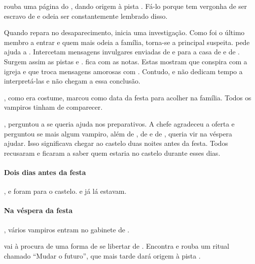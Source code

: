  rouba uma página do , dando origem à pista . Fá-lo porque tem vergonha de ser escravo de  e odeia ser constantemente lembrado disso.

Quando  repara no desaparecimento, inicia uma investigação. Como  foi o último membro a entrar e quem mais odeia a família, torna-se a principal suspeita.  pede ajuda a . Intercetam mensagens invulgares enviadas de e para a casa de  e de . Surgem assim as pistas  e .  fica com as notas. Estas mostram que  conspira com a igreja e que  troca mensagens amorosas com . Contudo,  e  não dedicam tempo a interpretá-las e não chegam a essa conclusão.

, como era costume,  marcou  como data da festa para acolher  na família. Todos os vampiros tinham de comparecer.

,  perguntou a  se queria ajuda nos preparativos. A chefe agradeceu a oferta e perguntou se mais algum vampiro, além de , de  e de , queria vir na véspera ajudar. Isso significava chegar ao castelo duas noites antes da festa. Todos recusaram e ficaram a saber quem estaria no castelo durante esses dias.

\paragraph{Dois dias antes da festa}

,  e  foram para o castelo.  e  já lá estavam.

\paragraph{Na véspera da festa}

, vários vampiros entram no gabinete de .

 vai à procura de uma forma de se libertar de . Encontra e rouba um ritual chamado ``Mudar o futuro'', que mais tarde dará origem à pista .

